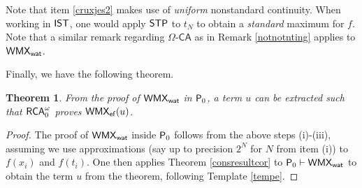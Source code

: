 \documentclass[reqno]{amsart}
\newtheorem{thm}{Theorem}
\def\STP{\textup{\textsf{STP}}}
\def\RCA{\textup{\textsf{RCA}}}
\def\RCAo{\textup{\textsf{RCA}}_{0}^{\omega}}
\def\ef{\textup{\textsf{ef}}}
\def\P{\textup{\textsf{P}}}
\def\IST{\textup{\textsf{IST}}}
\def\WMX{\textup{\textsf{WMX}}}
\def\wat{\textup{\textsf{wat}}}
\numberwithin{equation}{section}
\numberwithin{thm}{section}
\begin{document}
Note that item \eqref{cruxjes2} makes use of \emph{uniform} nonstandard continuity.  When working in $\IST$, one would apply $\STP$ to $t_{N}$ to obtain a \emph{standard} maximum for $f$.  Note that a similar remark regarding $\Omega\textsf{-CA}$ as in Remark \ref{notnotnting} applies to $\WMX_{\wat}$.

\medskip

Finally, we have the following theorem.  
\begin{thm}\label{hark4}
From the proof of $\WMX_{\textsf{\wat}}$ in $\P_{0}$, a term $u$ can be extracted such that $\RCAo$ proves $\WMX_{\ef}(u)$.
\end{thm}
\begin{proof}
The proof of $\WMX_{\wat}$ inside $\P_{0}$ follows from the above steps (i)-(iii), assuming we use approximations (say up to precision $2^{N}$ for $N$ from item (i)) to $f(x_{i})$ and $f(t_{i})$.  
One then applies Theorem \ref{consresultcor} to $\P_{0}\vdash \WMX_{\wat}$ to obtain the term $u$ from the theorem, following Template \ref{tempe}.  
\end{proof}
%
%
%
\end{document}
